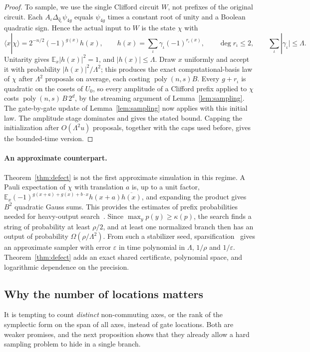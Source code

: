 \documentclass[a4paper,onecolumn,11pt,unpublished]{quantumarticle}
\theoremstyle{plain}
\theoremstyle{remark}
\newcommand{\braket}[2]{\langle #1|#2\rangle}
\DeclareMathOperator{\poly}{poly}
\newcommand{\E}{\mathbb{E}}
\begin{document}
\begin{proof}
To sample, we use the single Clifford circuit $W$, not prefixes of the original circuit. Each $A_\iota\Delta_{\hat q_\iota}\psi_{4g}$ equals $\psi_{4g}$ times a constant root of unity and a Boolean quadratic sign. Hence the actual input to $W$ is the state $\chi$ with
\[
\braket{x}{\chi}=2^{-n/2}(-1)^{g(x)}h(x),\qquad h(x)=\sum_\iota\gamma_\iota(-1)^{r_\iota(x)},\qquad\deg r_\iota\le2,\qquad\sum_\iota|\gamma_\iota|\le\Lambda .
\]
Unitarity gives $\E_x|h(x)|^2=1$, and $|h(x)|\le\Lambda$. Draw $x$ uniformly and accept it with probability $|h(x)|^2/\Lambda^2$; this produces the exact computational-basis law of $\chi$ after $\Lambda^2$ proposals on average, each costing $\poly(n,s)B$. Every $g+r_\iota$ is quadratic on the cosets of $U_0$, so every amplitude of a Clifford prefix applied to $\chi$ costs $\poly(n,s)\,B\,2^d$, by the streaming argument of Lemma~\ref{lem:sampling}. The gate-by-gate update of Lemma~\ref{lem:sampling} now applies with this initial law. The amplitude stage dominates and gives the stated bound. Capping the initialization after $O(\Lambda^2u)$ proposals, together with the caps used before, gives the bounded-time version.
\end{proof}

\paragraph{An approximate counterpart.}
Theorem~\ref{thm:defect} is not the first approximate simulation in this regime. A Pauli expectation of $\chi$ with translation $a$ is, up to a unit factor, $\E_x(-1)^{g(x+a)+g(x)+b\cdot x}h(x+a)\overline{h(x)}$, and expanding the product gives $B^2$ quadratic Gauss sums. This provides the estimates of prefix probabilities needed for heavy-output search~\cite{SV13}. Since $\max_yp(y)\ge\kappa(p)$, the search finds a string of probability at least $\rho/2$, and at least one normalized branch then has an output of probability $\Omega(\rho/\Lambda^2)$. From such a stabilizer seed, sparsification~\cite{BBC19} gives an approximate sampler with error $\varepsilon$ in time polynomial in $\Lambda$, $1/\rho$ and $1/\varepsilon$. Theorem~\ref{thm:defect} adds an exact shared certificate, polynomial space, and logarithmic dependence on the precision.

\subsection{Why the number of locations matters}

It is tempting to count \emph{distinct} non-commuting axes, or the rank of the symplectic form on the span of all axes, instead of gate locations. Both are weaker promises, and the next proposition shows that they already allow a hard sampling problem to hide in a single branch.
\end{document}
